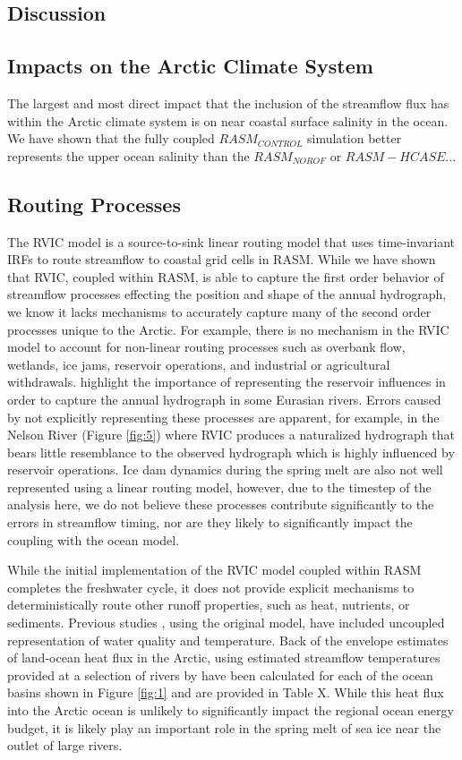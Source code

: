 \documentclass[jgrga, draft]{agutex}
\begin{document}
\begin{article}
\section{Discussion}

\subsection{Impacts on the Arctic Climate System}
The largest and most direct impact that the inclusion of the streamflow flux has within the Arctic climate system is on near coastal surface salinity in the ocean.
We have shown that the fully coupled $RASM_{CONTROL}$ simulation better represents the upper ocean salinity than the $RASM_{NOROF}$ or $RASM-HCASE$...

\subsection{Routing Processes}
The RVIC model is a source-to-sink linear routing model that uses time-invariant IRFs to route streamflow to coastal grid cells in RASM.
While we have shown that RVIC, coupled within RASM, is able to capture the first order behavior of streamflow processes effecting the position and shape of the annual hydrograph, we know it lacks mechanisms to accurately capture many of the second order processes unique to the Arctic.
For example, there is no mechanism in the RVIC model to account for non-linear routing processes such as overbank flow, wetlands, ice jams, reservoir operations, and industrial or agricultural withdrawals.
\citet{Adam_2007} highlight the importance of representing the reservoir influences in order to capture the annual hydrograph in some Eurasian rivers.
Errors caused by not explicitly representing these processes are apparent, for example, in the Nelson River (Figure \ref{fig:5}) where RVIC produces a naturalized hydrograph that bears little resemblance to the observed hydrograph which is highly influenced by reservoir operations.
Ice dam dynamics during the spring melt are also not well represented using a linear routing model, however, due to the timestep of the analysis here, we do not believe these processes contribute significantly to the errors in streamflow timing, nor are they likely to significantly impact the coupling with the ocean model.

While the initial implementation of the RVIC model coupled within RASM completes the freshwater cycle, it does not provide explicit mechanisms to deterministically route other runoff properties, such as heat, nutrients, or sediments.
Previous studies \citep[e.g.][]{vanVliet_2011,vanVliet_2012}, using the original \citet{Lohmann_1996} model, have included uncoupled representation of water quality and temperature.
Back of the envelope estimates of land-ocean heat flux in the Arctic, using estimated streamflow temperatures provided at a selection of rivers by \citet{Lammers_2007} have been calculated for each of the ocean basins shown in Figure \ref{fig:1} and are provided in Table X.
While this heat flux into the Arctic ocean is unlikely to significantly impact the regional ocean energy budget, it is likely play an important role in the spring melt of sea ice near the outlet of large rivers.


\end{article}
\end{document}
